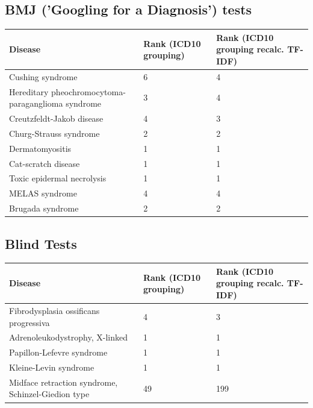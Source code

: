 \documentclass[10pt,letterpaper,final]{article}
\begin{document}
\subsection{BMJ ('Googling for a Diagnosis') tests }
\begin{center}
\begin{small}
	\begin{tabular}{|p{3.5cm}|p{1.8cm}|p{1.8cm}|}
	\hline
	\textbf{Disease}  & \textbf{Rank (ICD10 grouping)} & \textbf{Rank (ICD10 grouping recalc. TF-IDF)} \\
	\hline\hline
Cushing syndrome & 6 & 4\\    \hline
Hereditary pheochromocytoma-paraganglioma syndrome & 3 & 4\\    \hline
Creutzfeldt-Jakob disease & 4 & 3\\    \hline
Churg-Strauss syndrome & 2 & 2\\    \hline
Dermatomyositis & 1 & 1\\    \hline
Cat-scratch disease & 1 & 1\\    \hline
Toxic epidermal necrolysis & 1 & 1\\    \hline
MELAS syndrome & 4 & 4\\    \hline
Brugada syndrome & 2 & 2\\    \hline
	\end{tabular}
\end{small}
\end{center}

\subsection{Blind Tests}
\begin{center}
\begin{small}
	\begin{tabular}{|p{3.5cm}|p{1.8cm}|p{1.8cm}|}
	\hline
	\textbf{Disease}  & \textbf{Rank (ICD10 grouping)} & \textbf{Rank (ICD10 grouping recalc. TF-IDF)} \\
	\hline\hline
Fibrodysplasia ossificans progressiva & 4 & 3\\    \hline
Adrenoleukodystrophy, X-linked & 1 & 1\\    \hline
Papillon-Lefevre syndrome & 1 & 1\\    \hline
Kleine-Levin syndrome & 1 & 1\\    \hline
Midface retraction syndrome, Schinzel-Giedion type & 49 & 199\\    \hline
	\end{tabular}
\end{small}
\end{center}
\end{document}
